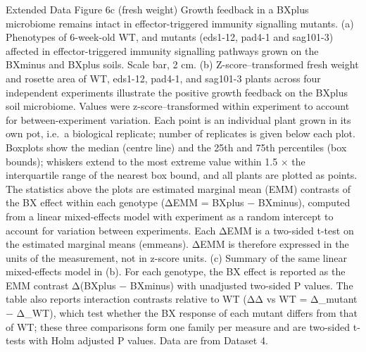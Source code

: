 \documentclass[
  10pt,
]{article}
\begin{document}
Extended Data Figure 6c (fresh weight) \textbar{} Growth feedback in a
BXplus microbiome remains intact in effector-triggered immunity
signalling mutants. (a) Phenotypes of 6-week-old WT, and mutants
(eds1-12, pad4-1 and sag101-3) affected in effector-triggered immunity
signalling pathways grown on the BXminus and BXplus soils. Scale bar, 2
cm. (b) Z-score--transformed fresh weight and rosette area of WT,
eds1-12, pad4-1, and sag101-3 plants across four independent experiments
illustrate the positive growth feedback on the BXplus soil microbiome.
Values were z-score--transformed within experiment to account for
between-experiment variation. Each point is an individual plant grown in
its own pot, i.e.~a biological replicate; number of replicates is given
below each plot. Boxplots show the median (centre line) and the 25th and
75th percentiles (box bounds); whiskers extend to the most extreme value
within 1.5 × the interquartile range of the nearest box bound, and all
plants are plotted as points. The statistics above the plots are
estimated marginal mean (EMM) contrasts of the BX effect within each
genotype (ΔEMM = BXplus − BXminus), computed from a linear mixed-effects
model with experiment as a random intercept to account for variation
between experiments. Each ΔEMM is a two-sided t-test on the estimated
marginal means (emmeans). ΔEMM is therefore expressed in the units of
the measurement, not in z-score units. (c) Summary of the same linear
mixed-effects model in (b). For each genotype, the BX effect is reported
as the EMM contrast Δ(BXplus − BXminus) with unadjusted two-sided P
values. The table also reports interaction contrasts relative to WT (ΔΔ
vs WT = Δ\_mutant − Δ\_WT), which test whether the BX response of each
mutant differs from that of WT; these three comparisons form one family
per measure and are two-sided t-tests with Holm adjusted P values. Data
are from Dataset 4.
\end{document}
